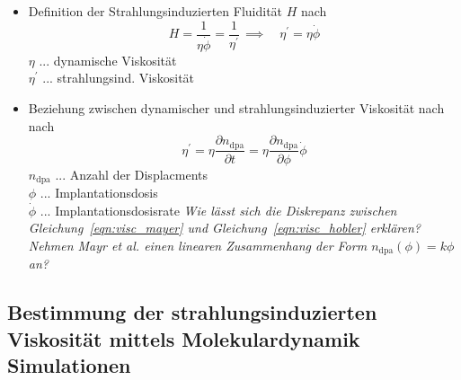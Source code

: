 \documentclass[a4paper, 10pt, 
               numbers=noenddot, toc=graduated,
               headsepline=true, footsepline=true,
               twoside=false, titlepage=true, 
               bibliography=totoc]{scrartcl}
\newcommand{\refeqn}[1]  {Gleichung~\ref{#1}}
\begin{document}
\begin{itemize}
\begin{itemize}
					     
		\end{itemize}
	
	\item Definition der Strahlungsinduzierten Fluidität $H$ nach \cite{Mayr2003}
	      \begin{equation}\label{eqn:visc_mayer}
		    H = \frac 1 {\eta \dot{\phi}} = \frac 1 {\eta^{'}}\, \implies \quad \eta^{'} = \eta \dot{\phi}
	      \end{equation}  
		$\eta$ ... dynamische Viskosität\\
		$\eta^{'}$ ... strahlungsind. Viskosität 
		
	\item Beziehung zwischen dynamischer und strahlungsinduzierter Viskosität nach nach \cite{hobler2017hpm}
	      \begin{equation}\label{eqn:visc_hobler}
		    \eta^{'} = \eta \frac{\partial n_\mathrm{dpa}}{\partial t} = \eta \frac{\partial n_\mathrm{dpa}}{\partial \phi} \dot{\phi}
	      \end{equation} 
		$ n_\mathrm{dpa}$ ... Anzahl der Displacments \\
		$\phi$ ... Implantationsdosis\\
		$\dot{\phi}$ ... Implantationsdosisrate\newline
		\textit{Wie lässt sich die Diskrepanz zwischen \refeqn{eqn:visc_mayer} und \refeqn{eqn:visc_hobler} erklären? Nehmen Mayr et al. einen linearen Zusammenhang der Form $n_\mathrm{dpa}(\phi) = k \phi$ an?}
		
		
	
\end{itemize}


\subsection{Bestimmung der strahlungsinduzierten Viskosität mittels Molekulardynamik Simulationen}
\end{document}
